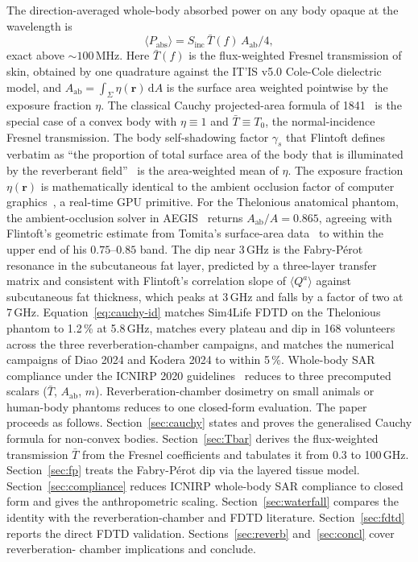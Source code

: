 \documentclass[journal,twocolumn,10pt]{IEEEtran}
\theoremstyle{plain}
\theoremstyle{remark}
\newcommand{\rr}{\mathbf{r}}
\newcommand{\Sinc}{S_{\mathrm{inc}}}
\newcommand{\Aab}{A_{\mathrm{ab}}}
\newcommand{\Tbar}{\bar{T}}
\newcommand{\diff}{\mathrm{d}}
\begin{document}
The direction-averaged whole-body absorbed power on any body opaque
at the wavelength is
\begin{equation}\label{eq:cauchy-id}
  \langle P_{\mathrm{abs}} \rangle = \Sinc\,\Tbar(f)\,\Aab/4,
\end{equation}
exact above $\sim 100\,$MHz. Here $\Tbar(f)$ is the flux-weighted
Fresnel transmission of skin, obtained by one quadrature against the
IT'IS v5.0 Cole-Cole dielectric model, and $\Aab = \int_\Sigma
\eta(\rr)\,\diff A$ is the surface area weighted pointwise by the
exposure fraction $\eta$. The classical Cauchy projected-area formula
of 1841~\cite{Cauchy1841} is the special case of a convex body with
$\eta \equiv 1$ and $\Tbar \equiv T_0$, the normal-incidence Fresnel
transmission. The body self-shadowing factor $\gamma_s$ that Flintoft
defines verbatim as ``the proportion of total surface area of the
body that is illuminated by the reverberant
field''~\cite[p.~3301]{Flintoft2014} is the area-weighted mean of
$\eta$. The exposure fraction $\eta(\rr)$ is mathematically identical
to the ambient occlusion factor of computer
graphics~\cite{Zhukov1998,Landis2002,AkenineMoller2018}, a real-time
GPU primitive. For the Thelonious anatomical phantom, the
ambient-occlusion solver in AEGIS~\cite{AEGIS2026} returns
$\Aab/A = 0.865$, agreeing with Flintoft's geometric estimate from
Tomita's surface-area data~\cite{Tomita1999} to within the upper end
of his $0.75$--$0.85$ band. The dip near 3\,GHz is the Fabry-P\'erot
resonance in the subcutaneous fat layer, predicted by a three-layer
transfer matrix and consistent with Flintoft's correlation slope of
$\langle Q^a\rangle$ against subcutaneous fat thickness, which peaks
at 3\,GHz and falls by a factor of two at 7\,GHz.
Equation~\eqref{eq:cauchy-id} matches Sim4Life FDTD on the Thelonious
phantom to 1.2\,\% at 5.8\,GHz, matches every plateau and dip in 168
volunteers across the three reverberation-chamber campaigns, and
matches the numerical campaigns of Diao 2024 and Kodera 2024 to
within 5\,\%. Whole-body SAR compliance under the ICNIRP 2020
guidelines~\cite{ICNIRP2020} reduces to three precomputed scalars
($\Tbar$, $\Aab$, $m$). Reverberation-chamber dosimetry on small
animals or human-body phantoms reduces to one closed-form evaluation.
The paper proceeds as follows. Section~\ref{sec:cauchy} states and
proves the generalised Cauchy formula for non-convex bodies.
Section~\ref{sec:Tbar} derives the flux-weighted transmission $\Tbar$
from the Fresnel coefficients and tabulates it from 0.3 to 100\,GHz.
Section~\ref{sec:fp} treats the Fabry-P\'erot dip via the layered
tissue model. Section~\ref{sec:compliance} reduces ICNIRP whole-body
SAR compliance to closed form and gives the anthropometric scaling.
Section~\ref{sec:waterfall} compares the identity with the
reverberation-chamber and FDTD literature.
Section~\ref{sec:fdtd} reports the direct FDTD validation.
Sections~\ref{sec:reverb} and~\ref{sec:concl} cover reverberation-
chamber implications and conclude.
\end{document}
